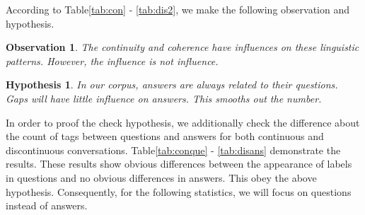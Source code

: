 \documentclass[bsc,frontabs,twoside,singlespacing,parskip,deptreport]{infthesis}     %
\newtheorem{observation}{Observation}[chapter]
\newtheorem{hypo}{Hypothesis}[chapter]
\begin{document}
According to Table\ref{tab:con} - \ref{tab:dis2}, we make the following observation and hypothesis.

\begin{observation}
The continuity and coherence have influences on these linguistic patterns. However, the influence is not influence.
\end{observation} 

\begin{hypo}
In our corpus, answers are always related to their questions. Gaps will have little influence on answers. This smooths out the number.
\end{hypo}



In order to proof the check hypothesis, we additionally check the difference about the count of tags between questions and answers for both continuous and discontinuous conversations. Table\ref{tab:conque} - \ref{tab:disans} demonstrate the results. These results show obvious differences between the appearance of labels in questions and no obvious differences in answers. This obey the above hypothesis. Consequently, for the following statistics, we will focus on questions instead of answers.
\end{document}
